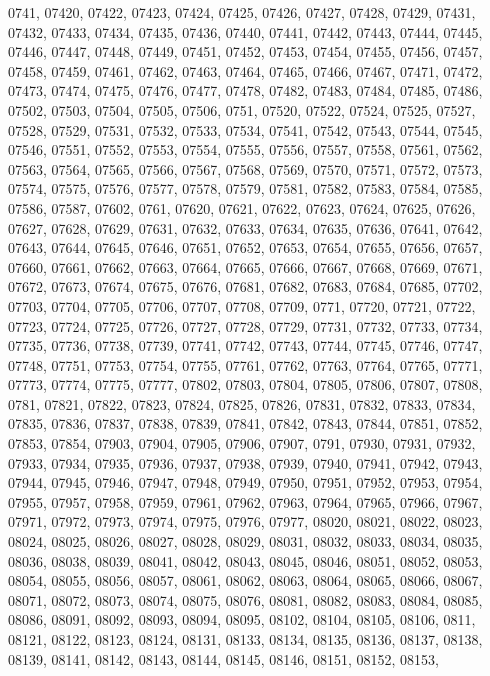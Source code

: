 {0741,
07420,
07422,
07423,
07424,
07425,
07426,
07427,
07428,
07429,
07431,
07432,
07433,
07434,
07435,
07436,
07440,
07441,
07442,
07443,
07444,
07445,
07446,
07447,
07448,
07449,
07451,
07452,
07453,
07454,
07455,
07456,
07457,
07458,
07459,
07461,
07462,
07463,
07464,
07465,
07466,
07467,
07471,
07472,
07473,
07474,
07475,
07476,
07477,
07478,
07482,
07483,
07484,
07485,
07486,
07502,
07503,
07504,
07505,
07506,
0751,
07520,
07522,
07524,
07525,
07527,
07528,
07529,
07531,
07532,
07533,
07534,
07541,
07542,
07543,
07544,
07545,
07546,
07551,
07552,
07553,
07554,
07555,
07556,
07557,
07558,
07561,
07562,
07563,
07564,
07565,
07566,
07567,
07568,
07569,
07570,
07571,
07572,
07573,
07574,
07575,
07576,
07577,
07578,
07579,
07581,
07582,
07583,
07584,
07585,
07586,
07587,
07602,
0761,
07620,
07621,
07622,
07623,
07624,
07625,
07626,
07627,
07628,
07629,
07631,
07632,
07633,
07634,
07635,
07636,
07641,
07642,
07643,
07644,
07645,
07646,
07651,
07652,
07653,
07654,
07655,
07656,
07657,
07660,
07661,
07662,
07663,
07664,
07665,
07666,
07667,
07668,
07669,
07671,
07672,
07673,
07674,
07675,
07676,
07681,
07682,
07683,
07684,
07685,
07702,
07703,
07704,
07705,
07706,
07707,
07708,
07709,
0771,
07720,
07721,
07722,
07723,
07724,
07725,
07726,
07727,
07728,
07729,
07731,
07732,
07733,
07734,
07735,
07736,
07738,
07739,
07741,
07742,
07743,
07744,
07745,
07746,
07747,
07748,
07751,
07753,
07754,
07755,
07761,
07762,
07763,
07764,
07765,
07771,
07773,
07774,
07775,
07777,
07802,
07803,
07804,
07805,
07806,
07807,
07808,
0781,
07821,
07822,
07823,
07824,
07825,
07826,
07831,
07832,
07833,
07834,
07835,
07836,
07837,
07838,
07839,
07841,
07842,
07843,
07844,
07851,
07852,
07853,
07854,
07903,
07904,
07905,
07906,
07907,
0791,
07930,
07931,
07932,
07933,
07934,
07935,
07936,
07937,
07938,
07939,
07940,
07941,
07942,
07943,
07944,
07945,
07946,
07947,
07948,
07949,
07950,
07951,
07952,
07953,
07954,
07955,
07957,
07958,
07959,
07961,
07962,
07963,
07964,
07965,
07966,
07967,
07971,
07972,
07973,
07974,
07975,
07976,
07977,
08020,
08021,
08022,
08023,
08024,
08025,
08026,
08027,
08028,
08029,
08031,
08032,
08033,
08034,
08035,
08036,
08038,
08039,
08041,
08042,
08043,
08045,
08046,
08051,
08052,
08053,
08054,
08055,
08056,
08057,
08061,
08062,
08063,
08064,
08065,
08066,
08067,
08071,
08072,
08073,
08074,
08075,
08076,
08081,
08082,
08083,
08084,
08085,
08086,
08091,
08092,
08093,
08094,
08095,
08102,
08104,
08105,
08106,
0811,
08121,
08122,
08123,
08124,
08131,
08133,
08134,
08135,
08136,
08137,
08138,
08139,
08141,
08142,
08143,
08144,
08145,
08146,
08151,
08152,
08153,
}
